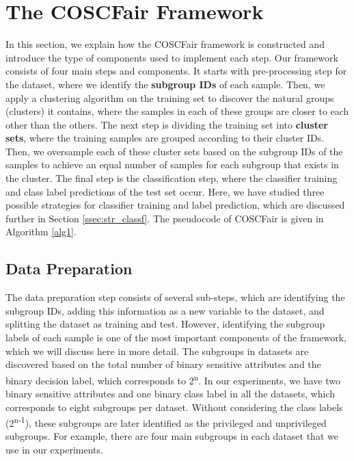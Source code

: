 \section{The COSCFair Framework} \label{sec:framework}

In this section, we explain how the COSCFair framework is constructed and introduce the type of components used to implement each step. Our framework consists of four main steps and components. It starts with pre-processing step for the dataset, where we identify the \textbf{subgroup IDs} of each sample. Then, we apply a clustering algorithm on the training set to discover the natural groups (clusters) it contains, where the samples in each of these groups are closer to each other than the others. The next step is dividing the training set into \textbf{cluster sets}, where the training samples are grouped according to their cluster IDs. Then, we oversample each of these cluster sets based on the subgroup IDs of the samples to achieve an equal number of samples for each subgroup that exists in the cluster. The final step is the classification step, where the classifier training and class label predictions of the test set occur. Here, we have studied three possible strategies for classifier training and label prediction, which are discussed further in Section \ref{ssec:str_classf}. The pseudocode of COSCFair is given in Algorithm \ref{alg1}.

\label{alg1}


\subsection{Data Preparation}\label{ssec:dataprep}

The data preparation step consists of several sub-steps, which are identifying the subgroup IDs, adding this information as a new variable to the dataset, and splitting the dataset as training and test. However, identifying the subgroup labels of each sample is one of the most important components of the framework, which we will discuss here in more detail. The subgroups in datasets are discovered based on the total number of binary sensitive attributes and the binary decision label, which corresponds to 2\textsuperscript{n}. In our experiments, we have two binary sensitive attributes and one binary class label in all the datasets, which corresponds to eight subgroups per dataset. Without considering the class labels (2\textsuperscript{n-1}), these subgroups are later identified as the privileged and unprivileged subgroups. For example, there are four main subgroups in each dataset that we use in our experiments.


